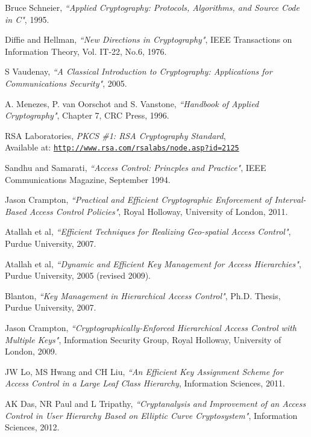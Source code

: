 \documentclass[12pt, titlepage]{article}
\begin{document}
\begin{thebibliography}{10}

Bruce Schneier, \emph{``Applied Cryptography: Protocols, Algorithms, and Source Code in C"}, 1995.

Diffie and Hellman, \emph{``New Directions in Cryptography"},
IEEE Transactions on Information Theory, Vol. IT-22, No.6, 1976.

S Vaudenay, \emph{``A Classical Introduction to Cryptography: Applications for Communications Security"}, 2005.

A. Menezes, P. van Oorschot and S. Vanstone, \emph{``Handbook of Applied Cryptography"}, Chapter 7, CRC Press, 1996.

RSA Laboratories, \emph{PKCS \#1: RSA Cryptography Standard},
\\ Available at: \texttt{\url{http://www.rsa.com/rsalabs/node.asp?id=2125}}

Sandhu and Samarati, \emph{``Access Control: Princples and Practice"},
IEEE Communications Magazine, September 1994.

Jason Crampton, \emph{``Practical and Efficient Cryptographic Enforcement of Interval-Based
Access Control Policies"}, Royal Holloway, University of London, 2011.

Atallah et al, \emph{``Efficient Techniques for Realizing Geo-spatial Access Control"},  Purdue University, 2007.

Atallah et al, \emph{``Dynamic and Efficient Key Management for Access Hierarchies"}, Purdue University, 2005 (revised 2009).

Blanton, \emph{``Key Management in Hierarchical Access Control"}, Ph.D. Thesis, Purdue University, 2007.

Jason Crampton, \emph{``Cryptographically-Enforced Hierarchical
Access Control with Multiple Keys"}, Information Security Group, Royal Holloway, University of London, 2009.

JW Lo, MS Hwang and CH Liu, \emph{``An Efficient Key Assignment Scheme for Access Control in a Large Leaf Class Hierarchy}, Information Sciences, 2011.

AK Das, NR Paul and L Tripathy, \emph{``Cryptanalysis and Improvement of an Access Control in User Hierarchy Based on Elliptic Curve Cryptosystem"}, Information Sciences, 2012.


\end{thebibliography}
\end{document}
